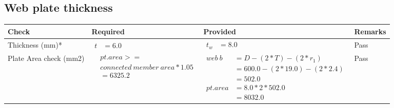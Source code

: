 \documentclass{article}%
\begin{document}
\subsection{Web plate thickness}%
\label{subsec:Webplatethickness}%
\renewcommand{\arraystretch}{1.2}%
\begin{longtable}{|p{2.5cm}|p{4.5cm}|p{7cm}|p{1.5cm}|}%
\hline%
\rowcolor{OsdagGreen}%
Check&Required&Provided&Remarks\\%
\hline%
\endhead%
\hline%
Thickness (mm)*&$\begin{aligned} t &=6.0\end{aligned}$&$\begin{aligned} t_w &=8.0\end{aligned}$&Pass\\%
\hline%
Plate Area check (mm2)&$\begin{aligned} &pt.area >= \\&connected~member~area * 1.05\\  &= 6325.2\end{aligned}$&$\begin{aligned} web~b &= D-(2*T)-(2*r_1)\\ &=600.0-(2*19.0)-(2*2.4)\\ &= 502.0 \\  pt.area &= 8.0*2* 502.0\\ &= 8032.0\end{aligned}$&Pass\\%
\hline%
\end{longtable}

%
\newpage%
\end{document}
